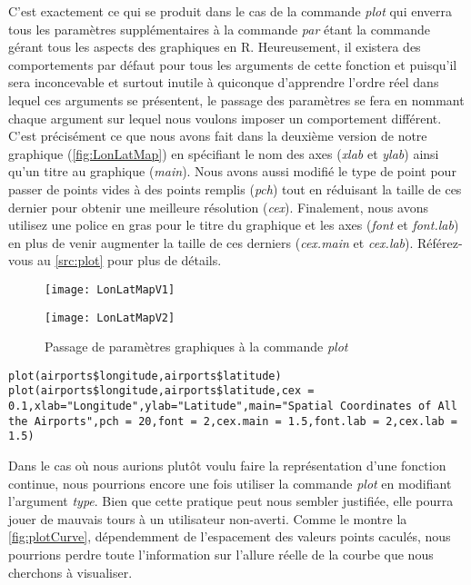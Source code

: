 \noindent
C'est exactement ce qui se produit dans le cas de la commande \emph{plot} qui enverra tous les paramètres supplémentaires à la commande \emph{par} étant la commande gérant tous les aspects des graphiques en R. Heureusement, il existera des comportements par défaut pour tous les arguments de cette fonction et puisqu'il sera inconcevable et surtout inutile à quiconque d'apprendre l'ordre réel dans lequel ces arguments se présentent, le passage des paramètres se fera en nommant chaque argument sur lequel nous voulons imposer un comportement différent. C'est précisément ce que nous avons fait dans la deuxième version de notre graphique (\autoref{fig:LonLatMap}) en spécifiant le nom des axes (\emph{xlab} et \emph{ylab}) ainsi qu'un titre au graphique (\emph{main}). Nous avons aussi modifié le type de point pour passer de points vides à des points remplis (\emph{pch}) tout en réduisant la taille de ces dernier pour obtenir une meilleure résolution (\emph{cex}). Finalement, nous avons utilisez une police en gras pour le titre du graphique et les axes (\emph{font} et \emph{font.lab}) en plus de venir augmenter la taille de ces derniers (\emph{cex.main} et \emph{cex.lab}). Référez-vous au \autoref{src:plot} pour plus de détails. \\
	
\begin{figure}
	\begin{minipage}{\textwidth}
		\centering
		\texttt{[image: LonLatMapV1]}
	\end{minipage}
	\newline
	\begin{minipage}{\textwidth}
		\centering
		\texttt{[image: LonLatMapV2]}
	\end{minipage}
	\caption{Passage de paramètres graphiques à la commande \emph{plot}}
\end{figure}
\label{fig:LonLatMap}

\begin{lstlisting}[caption = Utilisation de la commande \emph{plot},label=src:plot]
plot(airports$longitude,airports$latitude)
plot(airports$longitude,airports$latitude,cex = 0.1,xlab="Longitude",ylab="Latitude",main="Spatial Coordinates of All the Airports",pch = 20,font = 2,cex.main = 1.5,font.lab = 2,cex.lab = 1.5)
\end{lstlisting}

\vspace{\baselineskip}
\noindent
Dans le cas où nous aurions plutôt voulu faire la représentation d'une fonction continue, nous pourrions encore une fois utiliser la commande \emph{plot} en modifiant l'argument \emph{type}. Bien que cette pratique peut nous sembler justifiée, elle pourra jouer de mauvais tours à un utilisateur non-averti. Comme le montre la \autoref{fig:plotCurve}, dépendemment de l'espacement des valeurs points caculés, nous pourrions perdre toute l'information sur l'allure réelle de la courbe que nous cherchons à visualiser. \\

